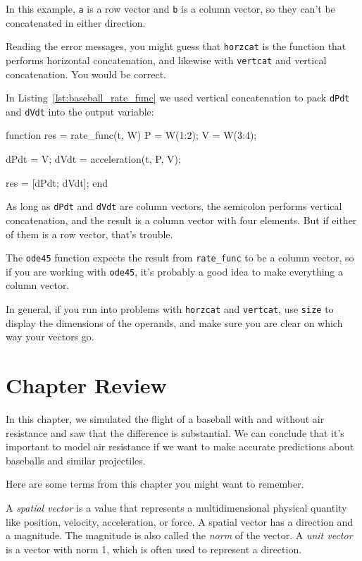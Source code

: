 In this example, \lstinline{a} is a row vector and \lstinline{b} is a column
vector, so they can't be concatenated in either direction.

Reading the error messages, you might guess that \lstinline{horzcat}
is the function that performs horizontal concatenation, and likewise
with \lstinline{vertcat} and vertical concatenation.  You would be correct.


In Listing~\ref{lst:baseball_rate_func} we used vertical concatenation to pack \lstinline{dPdt} and \lstinline{dVdt} into the output variable:

\begin{code}
function res = rate_func(t, W)
    P = W(1:2);
    V = W(3:4);

    dPdt = V;
    dVdt = acceleration(t, P, V);

    res = [dPdt; dVdt];
end
\end{code}

As long as \lstinline{dPdt} and \lstinline{dVdt} are column vectors,
the semicolon performs vertical concatenation, and the result is
a column vector with four elements.  But if either of them is a
row vector, that's trouble.


The \lstinline{ode45} function expects the result from \lstinline{rate_func} to be a
column vector, so if you are working with \lstinline{ode45}, it's
probably a good idea to make everything a column vector.

In general, if you run into problems with \lstinline{horzcat} and
\lstinline{vertcat}, use \lstinline{size} to display the dimensions of the operands,
and make sure you are clear on which way your vectors go.

\section{Chapter Review}

In this chapter, we simulated the flight of a baseball with and without air resistance and saw that the difference is substantial.
We can conclude that it's important to model air resistance if we want to make accurate predictions about baseballs and similar projectiles.

Here are some terms from this chapter you might want to remember.

A \emph{spatial vector} is a value that represents a multidimensional physical quantity like position, velocity, acceleration, or force.
A spatial vector has a direction and a magnitude.  The magnitude is also called the \emph{norm} of the vector.
A \emph{unit vector} is a vector with norm 1, which is often used to represent a
direction.

